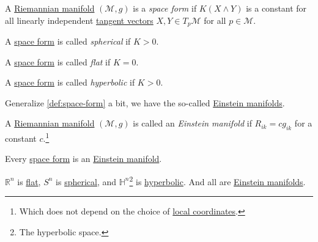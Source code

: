 \begin{definition}\label{def:space-form}
	A \hyperref[def:Riemannian-manifold]{Riemannian manifold} \((\mathcal{M} , g)\) is a \emph{space form} if \(K(X\wedge Y) \) is a constant for all linearly independent \hyperref[def:tangent-vector]{tangent vectors} \(X, Y\in T_p \mathcal{M} \) for all \(p\in \mathcal{M} \).

	\begin{definition}[Spherical]\label{def:space-form-spherical}
		A \hyperref[def:space-form]{space form} is called \emph{spherical} if \(K > 0\).
	\end{definition}

	\begin{definition}[Flat]\label{def:space-form-flat}
		A \hyperref[def:space-form]{space form} is called \emph{flat} if \(K = 0\).
	\end{definition}

	\begin{definition}[Hyperbolic]\label{def:space-form-hyperbolic}
		A \hyperref[def:space-form]{space form} is called \emph{hyperbolic} if \(K > 0\).
	\end{definition}
\end{definition}

Generalize \autoref{def:space-form} a bit, we have the so-called \hyperref[def:Einstein-manifold]{Einstein manifolds}.

\begin{definition}\label{def:Einstein-manifold}
	A \hyperref[def:Riemannian-manifold]{Riemannian manifold} \((\mathcal{M} , g)\) is called an \emph{Einstein manifold} if \(R_{ik} = c g_{ik} \) for a constant \(c\).\footnote{Which does not depend on the choice of \hyperref[def:coordinate-chart]{local coordinates}.}
\end{definition}

\begin{remark}
	Every \hyperref[def:space-form]{space form} is an \hyperref[def:Einstein-manifold]{Einstein manifold}.
\end{remark}

\begin{eg}
	\(\mathbb{R} ^n\) is \hyperref[def:space-form-flat]{flat}, \(S^n\) is \hyperref[def:space-form-spherical]{spherical}, and \(\mathbb{H} ^n\)\footnote{The hyperbolic space.} is \hyperref[def:space-form-hyperbolic]{hyperbolic}. And all are \hyperref[def:Einstein-manifold]{Einstein manifolds}.
	\begin{center}
	\end{center}
\end{eg}

